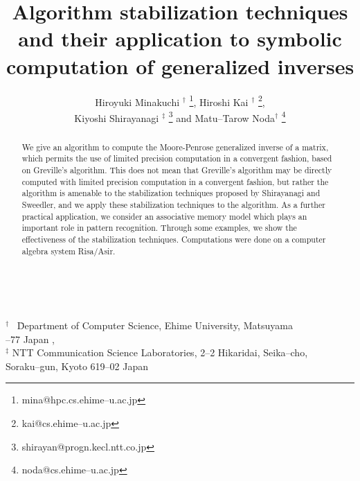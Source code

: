 \def\ONE{\leavevmode\rlap{$\bigcirc$}{\small \ 1}}
\def\R{\large \bf R}
\newcommand{\oh}{\mbox{\nodafont A}}
\newcommand{\tama}{\mbox{\nodafont B}}
\title{Algorithm stabilization techniques 
and their application to 
symbolic computation of generalized inverses}
\author{Hiroyuki Minakuchi $^{\dagger}$
\thanks{mina@hpc.cs.ehime--u.ac.jp}, 
Hiroshi Kai $^{\dagger}$ 
\thanks{kai@cs.ehime--u.ac.jp}, \\
Kiyoshi Shirayanagi $^{\ddagger}$
\thanks{shirayan@progn.kecl.ntt.co.jp} 
and Matu--Tarow Noda$^{\dagger}$ 
\thanks{noda@cs.ehime--u.ac.jp}}
\date{}

\maketitle
\ \\[-2em]
\begin{tabbing}
$^{\dagger} $ \ \= Department of Computer Science, Ehime
University, 
Matsuyama \\ --77 Japan , \\
$^{\ddagger} $ \> 
NTT Communication Science Laboratories, 2--2 Hikaridai, 
Seika--cho, \\ \> Soraku--gun, Kyoto 619--02 Japan
\end{tabbing} 
\begin{abstract}
We give an algorithm to compute the Moore-Penrose 
generalized inverse of a matrix, which permits the 
use of limited precision computation in a convergent 
fashion, based on Greville's algorithm.  This does 
not mean that Greville's algorithm may be directly 
computed with limited precision computation in a 
convergent fashion, but rather the algorithm is 
amenable to the stabilization techniques proposed 
by Shirayanagi and Sweedler, and we apply these 
stabilization techniques to the algorithm.
As a further practical application, we consider an associative memory 
model which plays an important role in pattern recognition.  
Through some examples, 
we show the effectiveness of the stabilization techniques.  
Computations were done on a computer algebra 
system Risa/Asir.
\end{abstract}
\newpage
